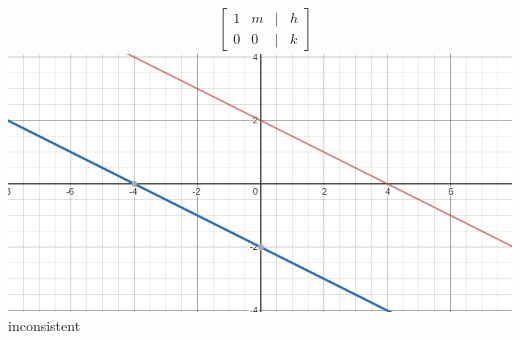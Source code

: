 \documentclass[14pt]{extarticle}
\begin{document}
\begin{multicols}{3}
\begin{align*}
		&\begin{bmatrix}
			1 & m & | & h\\
			0 & 0 & | & k
		\end{bmatrix} 
	\end{align*}
\includegraphics[width=1.0\linewidth]{4-1_a-15}
inconsistent\\
\vfill\null
\end{multicols}
\end{document}
